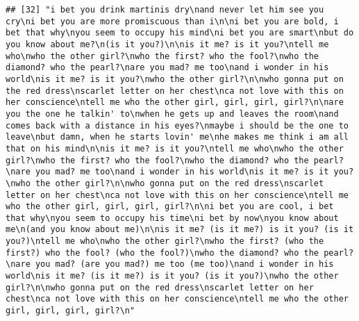 \documentclass[]{article}
\begin{document}
\begin{verbatim}
## [32] "i bet you drink martinis dry\nand never let him see you cry\ni bet you are more promiscuous than i\n\ni bet you are bold, i bet that why\nyou seem to occupy his mind\ni bet you are smart\nbut do you know about me?\n(is it you?)\n\nis it me? is it you?\ntell me who\nwho the other girl?\nwho the first? who the fool?\nwho the diamond? who the pearl?\nare you mad? me too\nand i wonder in his world\nis it me? is it you?\nwho the other girl?\n\nwho gonna put on the red dress\nscarlet letter on her chest\nca not love with this on her conscience\ntell me who the other girl, girl, girl, girl?\n\nare you the one he talkin' to\nwhen he gets up and leaves the room\nand comes back with a distance in his eyes?\nmaybe i should be the one to leave\nbut damn, when he starts lovin' me\nhe makes me think i am all that on his mind\n\nis it me? is it you?\ntell me who\nwho the other girl?\nwho the first? who the fool?\nwho the diamond? who the pearl?\nare you mad? me too\nand i wonder in his world\nis it me? is it you?\nwho the other girl?\n\nwho gonna put on the red dress\nscarlet letter on her chest\nca not love with this on her conscience\ntell me who the other girl, girl, girl, girl?\n\ni bet you are cool, i bet that why\nyou seem to occupy his time\ni bet by now\nyou know about me\n(and you know about me)\n\nis it me? (is it me?) is it you? (is it you?)\ntell me who\nwho the other girl?\nwho the first? (who the first?) who the fool? (who the fool?)\nwho the diamond? who the pearl?\nare you mad? (are you mad?) me too (me too)\nand i wonder in his world\nis it me? (is it me?) is it you? (is it you?)\nwho the other girl?\n\nwho gonna put on the red dress\nscarlet letter on her chest\nca not love with this on her conscience\ntell me who the other girl, girl, girl, girl?\n"                                                                                                                                                                                                                                                                                                                                                                                                                                                                                                                                                                                                                                                                                                                                                                                                                                                                                                                                                                                                                                                                                                                           

\end{verbatim}
\end{document}
